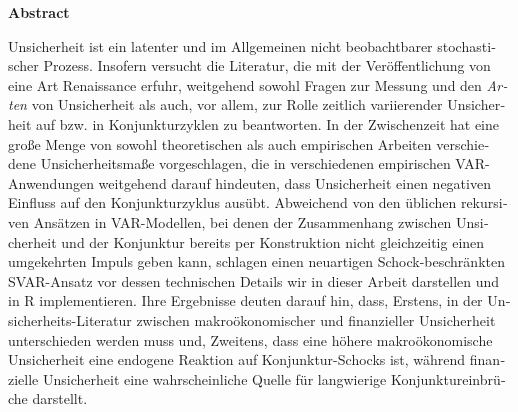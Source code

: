 \documentclass[a4paper,11pt,listof=nochaptergap,oneside,pointednumbers,bibtotoc,bigheadings,liststotoc,hidelinks]{scrbook}
\makeatletter
\theoremstyle{mysatz}
\theoremstyle{mydefinition}
\theoremstyle{mytheorem}
\theoremstyle{mybemerkung}
\newcommand\abstractname{Abstract}  %
\newenvironment{abstract}{%
      \titlepage
      \null\vfil
      \@beginparpenalty\@lowpenalty
      \begin{center}%
        \bfseries \abstractname
        \@endparpenalty\@M
      \end{center}}%
     {\par\vfil\null\endtitlepage}
\newenvironment{abstract}{%
      \if@twocolumn
        \section*{\abstractname}%
      \else
        \small
        \begin{center}%
          {\bfseries \abstractname\vspace{-.5em}\vspace{\z@}}%
        \end{center}%
        \quotation
      \fi}
      {\if@twocolumn\else\endquotation\fi}
\makeatother
\begin{document}
\begin{otherlanguage}{ngerman}
\begin{abstract}
Unsicherheit ist ein latenter und im Allgemeinen nicht beobachtbarer stochastischer Prozess. Insofern versucht die Literatur, die mit der Veröffentlichung von \citet{bloom:09} eine Art Renaissance erfuhr, weitgehend sowohl Fragen zur Messung und den \textit{Arten} von Unsicherheit als auch, vor allem, zur Rolle zeitlich variierender Unsicherheit auf bzw. in Konjunkturzyklen zu beantworten. In der Zwischenzeit hat eine große Menge von sowohl theoretischen als auch empirischen Arbeiten verschiedene Unsicherheitsmaße vorgeschlagen, die in verschiedenen empirischen VAR-Anwendungen weitgehend darauf hindeuten, dass Unsicherheit einen negativen Einfluss auf den Konjunkturzyklus ausübt. Abweichend von den üblichen rekursiven Ansätzen in VAR-Modellen, bei denen der Zusammenhang zwischen Unsicherheit und der Konjunktur bereits per Konstruktion nicht gleichzeitig einen umgekehrten Impuls geben kann, schlagen \citet{ludvigsonetal:18, ludvigsonetal:19} einen neuartigen Schock-beschränkten SVAR-Ansatz vor dessen technischen Details wir in dieser Arbeit darstellen und in R implementieren. Ihre Ergebnisse deuten darauf hin, dass, Erstens, in der Unsicherheits-Literatur zwischen makroökonomischer und finanzieller Unsicherheit unterschieden werden muss und, Zweitens, dass eine höhere makroökonomische Unsicherheit eine endogene Reaktion auf Konjunktur-Schocks ist, während finanzielle Unsicherheit eine wahrscheinliche Quelle für langwierige Konjunktureinbrüche darstellt.
\end{abstract}
\end{otherlanguage}






\restoregeometry

\thispagestyle{empty}
\pagestyle{fancy} %
\setcounter{page}{7} %
\tableofcontents
\newpage
\listoffigures

\newpage
\listoftables

\newpage

\end{document}

